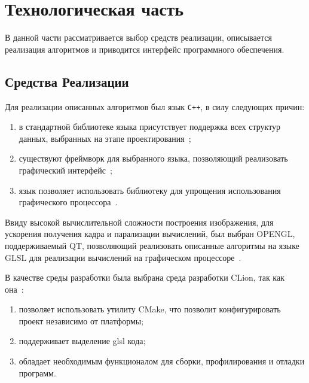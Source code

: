 \chapter{Технологическая часть}
В данной части рассматривается выбор средств реализации, описывается реализация алгоритмов и приводится интерфейс программного
обеспечения.




\section{Средства Реализации}
Для реализации описанных алгоритмов был язык \texttt{C++}, в силу следующих причин:
\begin{enumerate}
	\item в стандартной библиотеке языка присутствует поддержка всех структур данных,
	выбранных на этапе проектирования~\cite{STL};
	\item существуют фреймворк для выбранного языка, позволяющий реализовать графический интерфейс~\cite{qt_c++};
	\item язык позволяет использовать библиотеку для упрощения использования графического процессора~\cite{qt_opengl}.
\end{enumerate}


Ввиду высокой вычислительной сложности построения изображения, для ускорения получения кадра и
парализации вычислений, был выбран OPENGL, поддерживаемый QT, позволяющий реализовать описанные алгоритмы на языке GLSL для реализации вычислений на графическом процессоре~\cite{ray_trace_glsl}.

В качестве среды разработки была выбрана среда разработки  CLion, так как она~\cite{clion}:
\begin{enumerate}
    \item позволяет использовать утилиту CMake, что позволит конфигурировать проект независимо от платформы;
    \item поддерживает выделение glsl кода;
    \item обладает необходимым функционалом для сборки, профилирования и отладки программ.
\end{enumerate}


